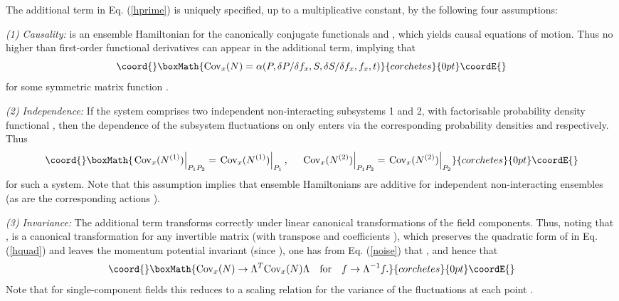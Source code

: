 \documentclass[a4paper,preprint, showpacs, aps, draft]{revtex4}
\begin{document}
{The additional term in Eq. (\ref{hprime}) is uniquely specified, up to a
multiplicative constant, by the following four assumptions:

{\it (1) Causality:}  \coordHE{} is an ensemble Hamiltonian for the
canonically conjugate functionals \coordHE{} and \coordHE{}, which yields causal equations
of motion. Thus no higher than first-order functional derivatives can appear in
the additional term, implying that 
\[\coord{}\boxMath{
{\rm Cov}_x(N) = \alpha(P, \delta P/\delta f_x, S, \delta S/\delta
f_x, f_x, t) 
}{corchetes}{0pt}\coordE{}\]
for some symmetric matrix function \myHighlight{$\alpha$}\coordHE{}.

{\it (2) Independence:}  If the system comprises two independent
non-interacting subsystems 1 and 2, with factorisable probability
density functional \coordHE{}, 
then the dependence of the subsystem fluctuations on \coordHE{} only enters via
the corresponding probability densities \coordHE{} and \coordHE{} respectively. Thus
\[\coord{}\boxMath{
\left.{\rm Cov}_x(N^{(1)})\right|_{P_1P_2} = \left.{\rm
Cov}_x(N^{(1)})\right|_{P_1}, ~~~~\left.{\rm
Cov}_x(N^{(2)})\right|_{P_1P_2} =\left.{\rm Cov}_x(N^{(2)})\right|_{P_2}
}{corchetes}{0pt}\coordE{}\]
for such a system.  
Note that this assumption implies that ensemble Hamiltonians are 
additive for independent non-interacting ensembles (as are the
corresponding actions \cite{footact}). 

{\it (3) Invariance:} The additional term transforms correctly under
linear canonical transformations of the field components.  Thus, noting 
that \coordHE{}, \coordHE{} is a
canonical transformation for any invertible matrix \myHighlight{$\Lambda$}\coordHE{} (with
transpose \coordHE{} and  
coefficients \coordHE{}), which preserves the quadratic form of \coordHE{}
in Eq. (\ref{hquad}) and leaves the momentum potential \coordHE{} invariant (since
\coordHE{}), one has from 
Eq. (\ref{noise}) that
\coordHE{}, and hence that
\[\coord{}\boxMath{ {\rm Cov}_x(N) \rightarrow \Lambda^T {\rm Cov}_x(N)\Lambda ~~~{\rm for}
~~~f\rightarrow\Lambda^{-1}f .}{corchetes}{0pt}\coordE{}\]
Note that for single-component fields this reduces to a scaling relation
for the variance of the fluctuations at each point \coordHE{}.
  
}
\end{document}

